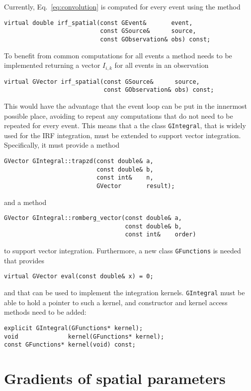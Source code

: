 \documentclass{article}[12pt,a4]
\begin{document}
Currently, Eq.~\ref{eq:convolution} is computed for every event using the method
\begin{verbatim}
virtual double irf_spatial(const GEvent&       event,
                           const GSource&      source,
                           const GObservation& obs) const;
\end{verbatim}
To benefit from common computations for all events a method needs to be implemented returning
a vector $I_{i,k}$ for all events in an observation
\begin{verbatim}
virtual GVector irf_spatial(const GSource&      source,
                            const GObservation& obs) const;
\end{verbatim}
This would have the advantage that the event loop can be put in the innermost possible place, avoiding
to repeat any computations that do not need to be repeated for every event.
This means that a the class {\tt GIntegral}, that is widely used for the IRF integration, must be extended
to support vector integration.
Specifically, it must provide a method
\begin{verbatim}
GVector GIntegral::trapzd(const double& a,
                          const double& b, 
                          const int&    n,
                          GVector       result);
\end{verbatim}
and a method
\begin{verbatim}
GVector GIntegral::romberg_vector(const double& a,
                                  const double& b,
                                  const int&    order)
\end{verbatim}
to support vector integration.
Furthermore, a new class {\tt GFunctions} is needed that provides 
\begin{verbatim}
virtual GVector eval(const double& x) = 0;
\end{verbatim}
and that can be used to implement the integration kernels.
{\tt GIntegral} must be able to hold a pointer to such a kernel, and constructor and kernel access
methods need to be added:
\begin{verbatim}
explicit GIntegral(GFunctions* kernel);
void              kernel(GFunctions* kernel);
const GFunctions* kernel(void) const;
\end{verbatim}


\section{Gradients of spatial parameters}
\end{document}
